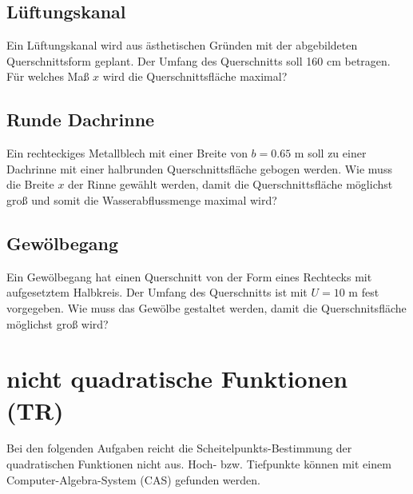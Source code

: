 \subsection{Lüftungskanal}
Ein Lüftungskanal wird aus ästhetischen
Gründen mit der abgebildeten Querschnittsform
geplant. Der Umfang des Querschnitts soll
160 cm betragen.
Für welches Maß $x$ wird die Querschnittsfläche
maximal?


\subsection{Runde Dachrinne}
Ein rechteckiges Metallblech mit einer Breite
von $b = 0.65 \text{ m}$ soll zu einer Dachrinne mit einer
halbrunden Querschnittsfläche gebogen werden.
Wie muss die Breite $x$ der Rinne gewählt werden,
damit die Querschnittsfläche möglichst groß und somit
die Wasserabflussmenge maximal wird?




\subsection{Gewölbegang}

Ein Gewölbegang hat einen Querschnitt
von der Form eines Rechtecks mit aufgesetztem Halbkreis. Der Umfang
des Querschnitts ist mit $U=10 \text{ m}$ fest vorgegeben.
Wie muss das Gewölbe gestaltet werden, damit die Querschnitsfläche
möglichst groß wird?


\newpage
\section{nicht quadratische Funktionen (TR)}
Bei den folgenden Aufgaben reicht die Scheitelpunkts-Bestimmung der
quadratischen Funktionen nicht aus. Hoch- bzw. Tiefpunkte können mit
einem Computer-Algebra-System (CAS) gefunden werden.


